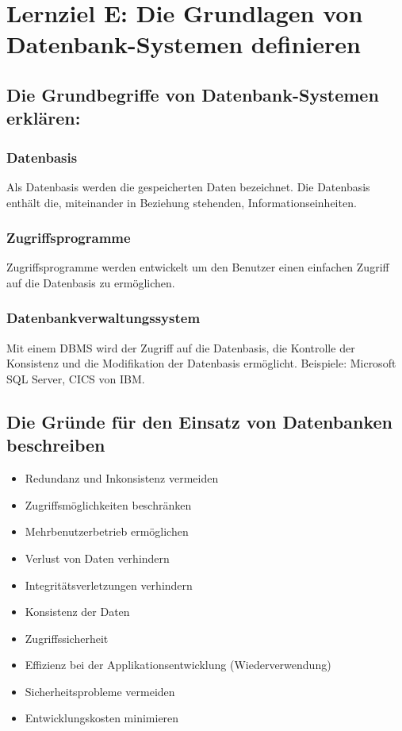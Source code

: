\section{Lernziel E: Die Grundlagen von Datenbank-Systemen definieren}

\subsection{Die Grundbegriffe von Datenbank-Systemen erklären:}

\subsubsection{Datenbasis}

Als Datenbasis werden die gespeicherten Daten bezeichnet. Die Datenbasis enthält die, miteinander in Beziehung stehenden, Informationseinheiten.

\subsubsection{Zugriffsprogramme} 

Zugriffsprogramme werden entwickelt um den Benutzer einen einfachen Zugriff auf die Datenbasis zu ermöglichen.

\subsubsection{Datenbankverwaltungssystem}

Mit einem \ac{DBMS} wird der Zugriff auf die Datenbasis, die Kontrolle der Konsistenz und die Modifikation der Datenbasis ermöglicht. Beispiele: Microsoft SQL Server, CICS von IBM.

\subsection{Die Gründe für den Einsatz von Datenbanken beschreiben}

\begin{itemize}
	\item Redundanz und Inkonsistenz vermeiden
	\item Zugriffsmöglichkeiten beschränken
	\item Mehrbenutzerbetrieb ermöglichen
	\item Verlust von Daten verhindern
	\item Integritätsverletzungen verhindern
	\item Konsistenz der Daten
	\item Zugriffssicherheit
	\item Effizienz bei der Applikationsentwicklung (Wiederverwendung)
	\item Sicherheitsprobleme vermeiden
	\item Entwicklungskosten minimieren
\end{itemize}

